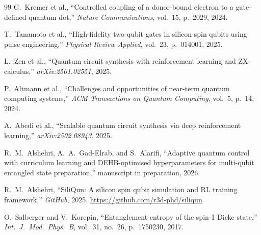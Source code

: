 \documentclass[journal]{IEEEtran}
\begin{document}
\begin{thebibliography}{99}
G.~Kremer et al.,
``Controlled coupling of a donor-bound electron to a gate-defined quantum dot,''
\textit{Nature Communications}, vol.~15, p.~2029, 2024.

T.~Tanamoto et al.,
``High-fidelity two-qubit gates in silicon spin qubits using pulse engineering,''
\textit{Physical Review Applied}, vol.~23, p.~014001, 2025.

L.~Zen et al.,
``Quantum circuit synthesis with reinforcement learning and ZX-calculus,''
\textit{arXiv:2501.02551}, 2025.

P.~Altmann et al.,
``Challenges and opportunities of near-term quantum computing systems,''
\textit{ACM Transactions on Quantum Computing}, vol.~5, p.~14, 2024.

A.~Abedi et al.,
``Scalable quantum circuit synthesis via deep reinforcement learning,''
\textit{arXiv:2502.08943}, 2025.

R.~M.~Alshehri, A.~A.~Gad-Elrab, and S.~Alarifi,
``Adaptive quantum control with curriculum learning and DEHB-optimised
hyperparameters for multi-qubit entangled state preparation,'' manuscript
in preparation, 2026.

R.~M.~Alshehri,
``SiliQun: A silicon spin qubit simulation and RL training framework,''
\textit{GitHub}, 2025. \url{https://github.com/r3d-phd/siliqun}

O.~Salberger and V.~Korepin,
``Entanglement entropy of the spin-1 Dicke state,''
\textit{Int.\ J.\ Mod.\ Phys.\ B}, vol.~31, no.~26, p.~1750230, 2017.

\end{thebibliography}
\end{document}
